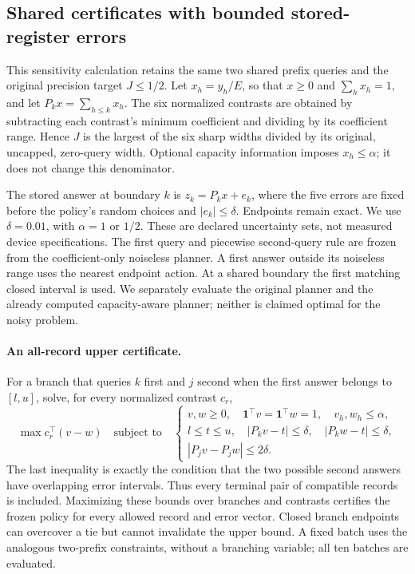\subsection{Shared certificates with bounded stored-register errors}
\label{sec:joint-stored-errors}
This sensitivity calculation retains the same two shared prefix queries and
the original precision target $J\leq 1/2$.  Let $x_h=y_h/E$, so that
$x\geq0$ and $\sum_hx_h=1$, and let $P_kx=\sum_{h\leq k}x_h$.
The six normalized contrasts are obtained by subtracting each contrast's
minimum coefficient and dividing by its coefficient range.  Hence $J$ is
the largest of the six sharp widths divided by its original, uncapped,
zero-query width.  Optional capacity information imposes $x_h\leq\alpha$;
it does not change this denominator.

The stored answer at boundary $k$ is $z_k=P_kx+e_k$, where the five errors
are fixed before the policy's random choices and $|e_k|\leq\delta$.
Endpoints remain exact.  We use $\delta=0.01$, with $\alpha=1$ or $1/2$.
These are declared uncertainty sets, not measured device specifications.
The first query and piecewise second-query rule are frozen from the
coefficient-only noiseless planner.  A first answer outside its noiseless
range uses the nearest endpoint action.  At a shared boundary the first
matching closed interval is used.  We separately evaluate the original
planner and the already computed capacity-aware planner; neither is claimed
optimal for the noisy problem.

\paragraph{An all-record upper certificate.}
For a branch that queries $k$ first and $j$ second when the first answer
belongs to $[l,u]$, solve, for every normalized contrast $c_r$,
\[
 \max c_r^\top(v-w)\quad\text{subject to}\quad
 \begin{cases}
 v,w\geq0,\quad\boldsymbol1^\top v=\boldsymbol1^\top w=1,
       \quad v_h,w_h\leq\alpha,\\
 l\leq t\leq u,\quad |P_kv-t|\leq\delta,
       \quad |P_kw-t|\leq\delta,\\
 |P_jv-P_jw|\leq2\delta.
 \end{cases}
\]
The last inequality is exactly the condition that the two possible second
answers have overlapping error intervals.  Thus every terminal pair of
compatible records is included.  Maximizing these bounds over branches and
contrasts certifies the frozen policy for every allowed record and error
vector.  Closed branch endpoints can overcover a tie but cannot invalidate
the upper bound.  A fixed batch uses the analogous two-prefix constraints,
without a branching variable; all ten batches are evaluated.

